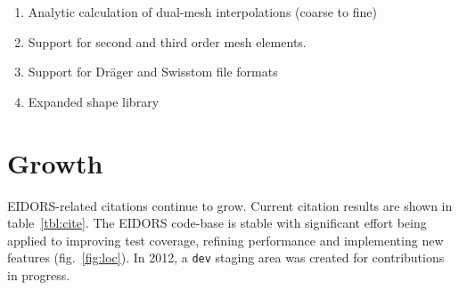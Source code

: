 \documentclass[10pt,letterpaper]{article}
\begin{document}
\begin{multicols}{2}
\begin{enumerate}
\item Analytic calculation of dual-mesh interpolations (coarse to fine)

\item Support for second and third order mesh elements.

\item Support for Dr\"ager and Swisstom file formats

\item Expanded shape library
\end{enumerate}

\section{Growth}
EIDORS-related citations continue to grow. Current citation results are
shown in table~\ref{tbl:cite}.
%
The EIDORS code-base is stable with significant effort being applied to
improving test coverage, refining performance and implementing new features
(fig.~\ref{fig:loc}). In 2012, a {\tt dev} staging area was created for
contributions in progress.


\end{multicols}
\end{document}
